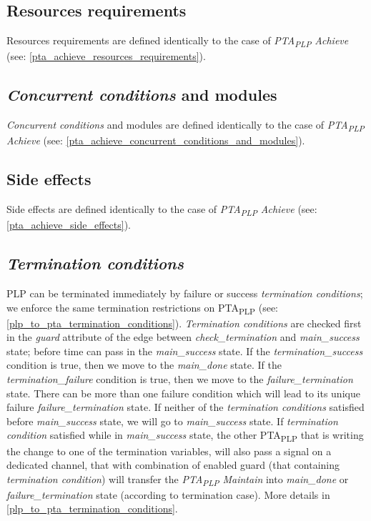 \subsection{Resources requirements}
Resources requirements are defined identically to the case of \textit{PTA\textsubscript{PLP} Achieve}  (see: \ref{pta_achieve_resources_requirements}).\\
\subsection{\textit{Concurrent conditions} and modules}
\textit{Concurrent conditions} and modules are defined identically to the case of \textit{PTA\textsubscript{PLP} Achieve}  (see: \ref{pta_achieve_concurrent_conditions_and_modules}).\\
\subsection{Side effects}
Side effects are defined identically to the case of \textit{PTA\textsubscript{PLP} Achieve}  (see: \ref{pta_achieve_side_effects}).\\
\subsection{\textit{Termination conditions} }
PLP can be terminated immediately by failure or success \textit{termination conditions}; we enforce the same termination restrictions on PTA\textsubscript{PLP} (see: \ref{plp_to_pta_termination_conditions}). \textit{Termination conditions} are checked first in the \textit{guard} attribute of the edge between \textcolor{ColorUppaalState}{\textit{check_termination}} and \textcolor{ColorUppaalState}{\textit{main_success}} state; before time can pass in the \textcolor{ColorUppaalState}{\textit{main_success}} state. If the \textcolor{ColorEdgeGuard}{\textit{termination_success}} condition is true, then we move to the \textcolor{ColorUppaalState}{\textit{main_done}} state. If the \textcolor{ColorEdgeGuard}{\textit{termination_failure}} condition is true, then we move to the \textcolor{ColorUppaalState}{\textit{failure_termination}} state. There can be more than one failure condition which will lead to its unique failure  \textcolor{ColorUppaalState}{\textit{failure_termination}} state. If neither of the \textit{termination conditions} satisfied before \textcolor{ColorUppaalState}{\textit{main_success}} state, we will go to \textcolor{ColorUppaalState}{\textit{main_success}} state. If \textit{termination condition} satisfied while in \textcolor{ColorUppaalState}{\textit{main_success}} state, the other PTA\textsubscript{PLP} that is writing the change to one of the termination variables, will also pass a signal on a dedicated channel, that with combination of enabled guard (that containing \textit{termination condition}) will transfer the \textit{PTA\textsubscript{PLP} Maintain} into \textcolor{ColorUppaalState}{\textit{main_done}} or \textcolor{ColorUppaalState}{\textit{failure_termination}} state (according to termination case). More details in \ref{plp_to_pta_termination_conditions}. \\
\clearpage
